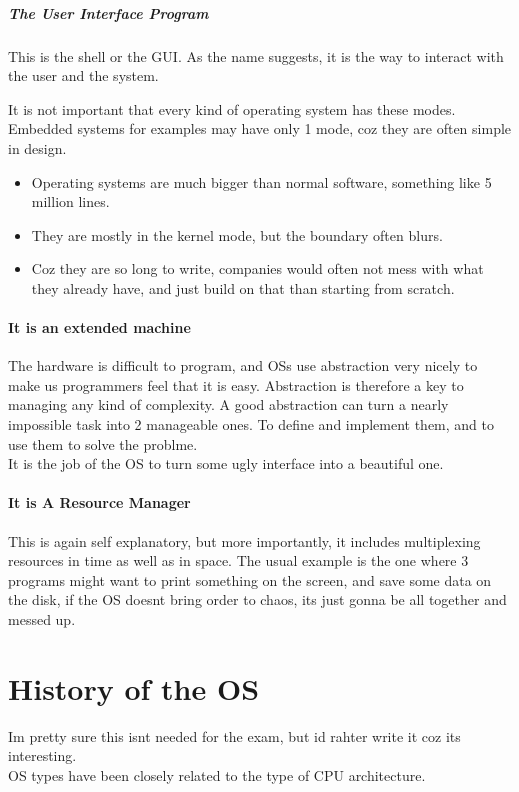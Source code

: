 \documentclass[11pt]{article}
\begin{document}
\subparagraph{The User Interface Program}

This is the shell or the GUI. As the name suggests, it is the way to interact with the user and the system.

It is not important that every kind of operating system has these modes. Embedded systems for examples may have only 1 mode, coz they are often simple in design.

\begin{itemize}
	\item Operating systems are much bigger than normal software, something like 5 million lines.
	\item They are mostly in the kernel mode, but the boundary often blurs.
	\item Coz they are so long to write, companies would often not mess with what they already have, and just build on that than starting from scratch.
\end{itemize}

\paragraph{It is an extended machine}
The hardware is difficult to program, and OSs use abstraction very nicely to make us programmers feel that it is easy. Abstraction is therefore a key to managing any kind of complexity. A good abstraction can turn a nearly impossible task into 2 manageable ones. To define and implement them, and to use them to solve the problme. \\
It is the job of the OS to turn some ugly interface into a beautiful one. 
\paragraph{It is A Resource Manager}
This is again self explanatory, but more importantly, it includes multiplexing resources in time as well as in space. The usual example is the one where 3 programs might want to print something on the screen, and save some data on the disk, if the OS doesnt bring order to chaos, its just gonna be all together and messed up. 

\section{History of the OS}
Im pretty sure this isnt needed for the exam, but id rahter write it coz its interesting.\\ OS types have been closely related to the type of CPU architecture. 
\end{document}
